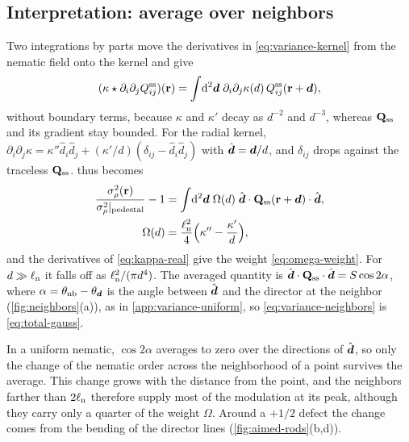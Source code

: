 \documentclass[aps,pre,reprint,superscriptaddress,longbibliography,nofootinbib
]{revtex4-2}
\begin{document}
\subsection{Interpretation: average over neighbors}
\label{app:variance-neighbors}
Two integrations by parts move the derivatives in
\cref{eq:variance-kernel} from the nematic field onto the
kernel and give
\begin{equation}
  (\kappa\star\partial_i\partial_jQ^{\mathrm{ss}}_{ij})(\mathbf{r})
  =\int\!\mathrm{d}^2\boldsymbol d\;\partial_i\partial_j\kappa(d)\,Q^{\mathrm{ss}}_{ij}(\mathbf{r}+\boldsymbol d),
\end{equation}
without boundary terms, because $\kappa$ and $\kappa'$
decay as $d^{-2}$ and $d^{-3}$, whereas $\mathbf{Q}_{\mathrm{ss}}$ and its
gradient stay bounded. For the radial kernel,
$\partial_i\partial_j\kappa=\kappa''\hat d_i\hat
d_j+(\kappa'/d)(\delta_{ij}-\hat d_i\hat d_j)$ with
$\hat{\boldsymbol d}=\boldsymbol d/d$, and $\delta_{ij}$ drops against the
traceless $\mathbf{Q}_{\mathrm{ss}}$.  thus becomes
\begin{align}
  \label{eq:variance-neighbors}
  \frac{\sigma_\rho^2(\mathbf{r})}{\sigma_\rho^2|_\text{pedestal}}-1
  &=\int\!\mathrm{d}^2\boldsymbol d\;\Omega(d)\;\hat{\boldsymbol d}\cdot\mathbf{Q}_{\mathrm{ss}}(\mathbf{r}+\boldsymbol d)\cdot\hat{\boldsymbol d},
  \nonumber\\
  \Omega(d)&=\frac{\ell_{\rm n}^2}4\Bigl(\kappa''-\frac{\kappa'}d\Bigr),
\end{align}
and the derivatives of \cref{eq:kappa-real} give the weight
\cref{eq:omega-weight}. For $d\gg\ell_{\rm n}$ it falls off as
$\ell_{\rm n}^2/(\pi d^4)$. The averaged quantity is $\hat{\boldsymbol
d}\cdot\mathbf{Q}_{\mathrm{ss}}\cdot\hat{\boldsymbol d}=S\cos2\alpha$, where
$\alpha=\theta_\text{nb}-\theta_{\boldsymbol d}$ is the angle
between $\hat{\boldsymbol d}$ and the director at the neighbor
(\cref{fig:neighbors}(a)), as in
\cref{app:variance-uniform}, so
\cref{eq:variance-neighbors} is \cref{eq:total-gauss}.

In a uniform nematic, $\cos2\alpha$ averages to zero over
the directions of $\hat{\boldsymbol d}$, so only the change of the
nematic order across the neighborhood of a point survives
the average. This change grows with the distance from the
point, and the neighbors farther than $2\ell_{\rm n}$ therefore
supply most of the modulation at its peak, although they
carry only a quarter of the weight $\Omega$. Around a
$+1/2$ defect the change comes from the bending of the
director lines (\cref{fig:aimed-rods}(b,d)).
\end{document}
